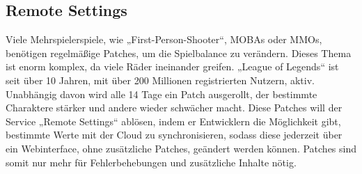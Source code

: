 \subsection{Remote Settings}
Viele Mehrspielerspiele, wie „First-Person-Shooter“, MOBAs oder MMOs, benötigen regelmäßige Patches, um die Spielbalance zu verändern. Dieses Thema ist enorm komplex, da viele Räder ineinander greifen. „League of Legends“ ist seit über 10 Jahren, mit über 200 Millionen registrierten Nutzern, aktiv. Unabhängig davon wird alle 14 Tage ein Patch ausgerollt, der bestimmte Charaktere stärker und andere wieder schwächer macht. Diese Patches will der Service „Remote Settings“ ablösen, indem er Entwicklern die Möglichkeit gibt, bestimmte Werte mit der Cloud zu synchronisieren, sodass diese jederzeit über ein Webinterface, ohne zusätzliche Patches, geändert werden können. Patches sind somit nur mehr für Fehlerbehebungen und zusätzliche Inhalte nötig.

